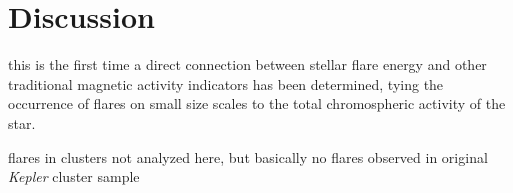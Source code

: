 \documentclass[preprint2]{aastex62}
\newcommand{\Kepler}{\textsl{Kepler}\xspace}
\begin{document}
%
%
%
%



%





\section{Discussion}
\label{sec:discussion}

this is the first time a direct connection between stellar flare energy and other traditional magnetic activity indicators has been determined, tying the occurrence of flares on small size scales to the total chromospheric activity of the star.


flares in clusters not analyzed here, but basically no flares observed in original \Kepler cluster sample
\end{document}
